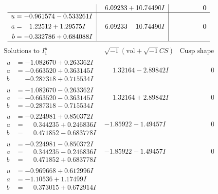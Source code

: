 \documentclass[1p]{elsarticle_modified}
\theoremstyle{definition}
\newcommand{\I}{\sqrt{-1}}
\begin{document}
$$\begin{array}{c|c|c}
 & \phantom{-}6.09233 + 10.74490 I & \phantom{-0.000000 } 0 \\ \hline\begin{aligned}
u &= -0.961574 - 0.533261 I \\
a &= \phantom{-}1.22512 + 1.29575 I \\
b &= -0.332786 + 0.684088 I\end{aligned}
 & \phantom{-}6.09233 - 10.74490 I & \phantom{-0.000000 } 0\\
 \hline 
 \end{array}$$\newpage$$\begin{array}{c|c|c}  
\text{Solutions to }I^u_{1}& \I (\text{vol} + \sqrt{-1}CS) & \text{Cusp shape}\\
 \hline 
\begin{aligned}
u &= -1.082670 + 0.263362 I \\
a &= -0.663520 + 0.363145 I \\
b &= -0.287318 + 0.715534 I\end{aligned}
 & \phantom{-}1.32164 - 2.89842 I & \phantom{-0.000000 } 0 \\ \hline\begin{aligned}
u &= -1.082670 - 0.263362 I \\
a &= -0.663520 - 0.363145 I \\
b &= -0.287318 - 0.715534 I\end{aligned}
 & \phantom{-}1.32164 + 2.89842 I & \phantom{-0.000000 } 0 \\ \hline\begin{aligned}
u &= -0.224981 + 0.850372 I \\
a &= \phantom{-}0.344235 + 0.246836 I \\
b &= \phantom{-}0.471852 - 0.683778 I\end{aligned}
 & -1.85922 - 1.49457 I & \phantom{-0.000000 } 0 \\ \hline\begin{aligned}
u &= -0.224981 - 0.850372 I \\
a &= \phantom{-}0.344235 - 0.246836 I \\
b &= \phantom{-}0.471852 + 0.683778 I\end{aligned}
 & -1.85922 + 1.49457 I & \phantom{-0.000000 } 0 \\ \hline\begin{aligned}
u &= -0.969668 + 0.612996 I \\
a &= -1.10536 + 1.17499 I \\
b &= \phantom{-}0.373015 + 0.672914 I\end{aligned}

\end{array}$$
\end{document}
